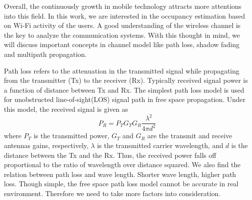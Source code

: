 Overall, the continuously growth in mobile technology attracts more attentions into this field.  In this work, we are interested in the
occupancy estimation based on Wi-Fi activity of the users. A good understanding of the wireless channel is the key to analyze the communication systems. With this thought in mind, we will discuss important concepts in channel model like path loss, shadow fading and multipath propagation.

Path loss refers to the attenuation in the transmitted signal while propagating from the transmitter (Tx) to the receiver (Rx). Typically received signal power is a function of distance between Tx and Rx. The simplest path loss model is used for unobstructed line-of-sight(LOS) signal path in free space propagation. Under this model, the received signal is given as
\begin{equation}
P_{R} = P_{T} G_{T} G_{R} \frac{\lambda^2}{4 \pi d^2}
\end{equation}
where $P_{T}$ is the transmitted power, $G_{T}$ and $G_{R}$ are the transmit and receive antennas gains, respectively, $\lambda$ is the transmitted carrier wavelength, and $d$ is the distance between the Tx and the Rx. Thus, the received power falls off proportional to the ratio of wavelength over distance squared. We also find the relation between path loss and wave length. Shorter wave length, higher path loss.
Though simple, the free space path loss model cannot be accurate in real environment. Therefore we need to take more factors into consideration.

